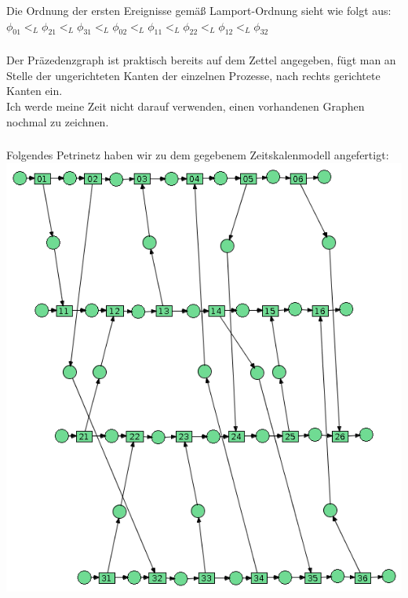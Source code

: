\documentclass[a4paper,12pt]{scrartcl}
\begin{document}
\subsubsection{}
Die Ordnung der ersten Ereignisse gemäß Lamport-Ordnung sieht wie folgt aus:\\
$\phi_{01} <_L \phi_{21} <_L \phi_{31} <_L \phi_{02} <_L \phi_{11} <_L \phi_{22} <_L \phi_{12} <_L \phi_{32}$
\subsubsection{}
Der Präzedenzgraph ist praktisch bereits auf dem Zettel angegeben, fügt man an Stelle der ungerichteten Kanten der einzelnen Prozesse, nach rechts gerichtete Kanten ein.\\
Ich werde meine Zeit nicht darauf verwenden, einen vorhandenen Graphen nochmal zu zeichnen.
\subsubsection{}
Folgendes Petrinetz haben wir zu dem gegebenem Zeitskalenmodell angefertigt:\\
\includegraphics[scale=0.5]{./b06_a636.png}
\subsection{}
\end{document}

